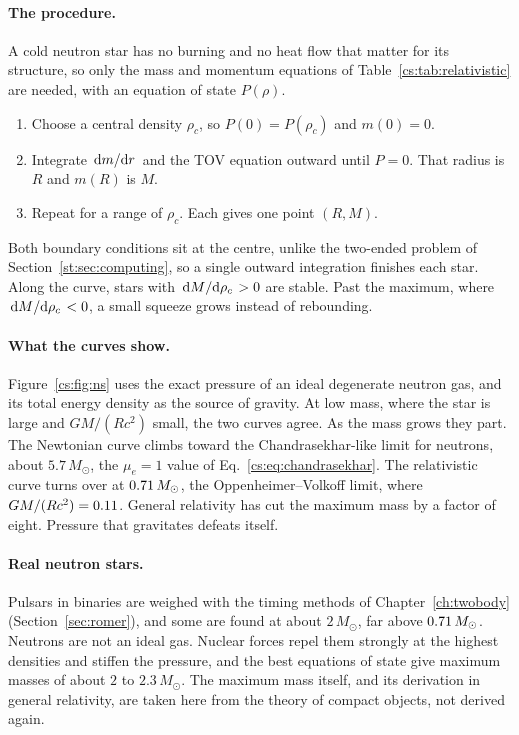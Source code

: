 \paragraph{The procedure.} A cold neutron star has no burning and no heat flow that matter for its structure, so only the mass and momentum equations of Table~\ref{cs:tab:relativistic} are needed, with an equation of state $P(\rho)$.
\begin{enumerate}
	\item Choose a central density $\rho_c$, so $P(0)=P(\rho_c)$ and $m(0)=0$.
	\item Integrate $\dv*{m}{r}$ and the TOV equation outward until $P=0$. That radius is $R$ and $m(R)$ is $M$.
	\item Repeat for a range of $\rho_c$. Each gives one point $(R,M)$.
\end{enumerate}
Both boundary conditions sit at the centre, unlike the two-ended problem of Section~\ref{st:sec:computing}, so a single outward integration finishes each star. Along the curve, stars with $\dv*{M}{\rho_c}>0$ are stable. Past the maximum, where $\dv*{M}{\rho_c}<0$, a small squeeze grows instead of rebounding.

\paragraph{What the curves show.} Figure~\ref{cs:fig:ns} uses the exact pressure of an ideal degenerate neutron gas, and its total energy density as the source of gravity. At low mass, where the star is large and $GM/(Rc^2)$ small, the two curves agree. As the mass grows they part. The Newtonian curve climbs toward the Chandrasekhar-like limit for neutrons, about $5.7\,M_\odot$, the $\mu_e=1$ value of Eq.~\eqref{cs:eq:chandrasekhar}. The relativistic curve turns over at $0.71\,M_\odot$, the Oppenheimer–Volkoff limit, where $GM/(Rc^2)=0.11$. General relativity has cut the maximum mass by a factor of eight. Pressure that gravitates defeats itself.

\paragraph{Real neutron stars.} Pulsars in binaries are weighed with the timing methods of Chapter~\ref{ch:twobody} (Section~\ref{sec:romer}), and some are found at about $2\,M_\odot$, far above $0.71\,M_\odot$. Neutrons are not an ideal gas. Nuclear forces repel them strongly at the highest densities and stiffen the pressure, and the best equations of state give maximum masses of about $2$ to $2.3\,M_\odot$. The maximum mass itself, and its derivation in general relativity, are taken here from the theory of compact objects, not derived again.

